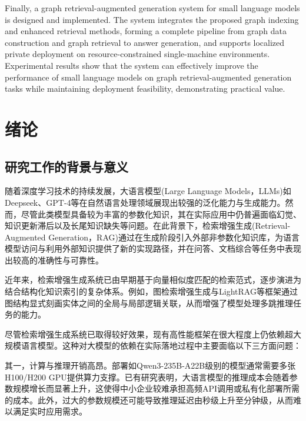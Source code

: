 \documentclass[promaster, vlined]{DissertUESTC}
\begin{document}
Finally, a graph retrieval-augmented generation system for small language models is designed and implemented. The system integrates the proposed graph indexing and enhanced retrieval methods, forming a complete pipeline from graph data construction and graph retrieval to answer generation, and supports localized private deployment on resource-constrained single-machine environments. Experimental results show that the system can effectively improve the performance of small language models on graph retrieval-augmented generation tasks while maintaining deployment feasibility, demonstrating practical value.


\tableofcontents
\listoffigures
\listoftables

\chapter{绪\hspace{6pt}论}

\section{研究工作的背景与意义}
随着深度学习技术的持续发展，大语言模型(Large Language Models，LLMs)如Deepseek、GPT-4等在自然语言处理领域展现出较强的泛化能力与生成能力。然而，尽管此类模型具备较为丰富的参数化知识，其在实际应用中仍普遍面临幻觉\cite{zhang2025siren}、知识更新滞后以及长尾知识缺失等问题。在此背景下，检索增强生成(Retrieval-Augmented Generation，RAG)\cite{lewis2020retrieval}通过在生成阶段引入外部非参数化知识库，为语言模型访问与利用外部知识提供了新的实现路径，并在问答、文档综合等任务中表现出较高的准确性与可靠性。

近年来，检索增强生成系统已由早期基于向量相似度匹配的检索范式，逐步演进为结合结构化知识索引的复杂体系。例如，图检索增强生成\cite{edge2024local}与LightRAG\cite{guo2024lightrag}等框架通过图结构显式刻画实体之间的全局与局部逻辑关联，从而增强了模型处理多跳推理任务的能力。

尽管检索增强生成系统已取得较好效果，现有高性能框架在很大程度上仍依赖超大规模语言模型。这种对大模型的依赖在实际落地过程中主要面临以下三方面问题：

其一，计算与推理开销高昂。部署如{Qwen3-235B-A22B}\cite{yang2025qwen3}级别的模型通常需要多张H100/H200 GPU提供算力支撑。已有研究表明，大语言模型的推理成本会随着参数规模增长而显著上升，这使得中小企业较难承担高频API调用或私有化部署所需的成本。此外，过大的参数规模还可能导致推理延迟由秒级上升至分钟级，从而难以满足实时应用需求。
\end{document}
